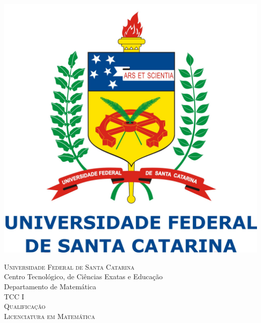 \documentclass[11pt]{article}
\begin{document}
%

\begin{titlepage}

\newcommand{\HRule}{\rule{\linewidth}{0.5mm}} %

\center %
 

\begin{center}
\includegraphics[scale=0.22]{logoufsc}
\end{center}

\vspace{1cm}

\textsc{\LARGE Universidade Federal de Santa Catarina}\\[0.5cm] %
{\Large Centro Tecnológico, de Ciências Exatas e Educação \\ Departamento de Matemática}\\[1.5cm] %
\textsc{\Large TCC I\\Qualificação\vspace{1.5cm} \\ {Licenciatura em Matemática}}\\[2.0cm] %


\end{titlepage}
\end{document}
